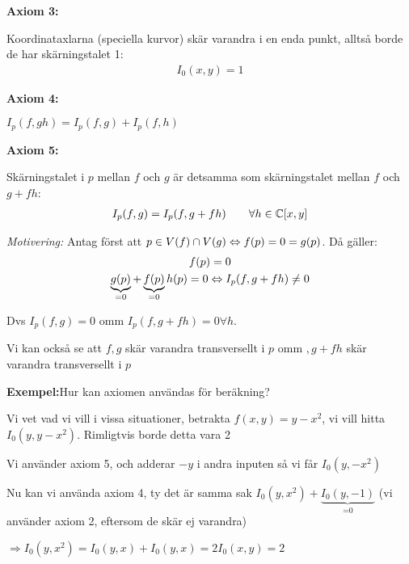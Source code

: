 \par\bigskip
\noindent\textbf{Axiom 3:}\par
\noindent Koordinataxlarna (speciella kurvor) skär varandra i en enda punkt, alltså borde de har skärningstalet 1:
\begin{equation*}
  \begin{gathered}
    I_0(x,y) = 1
  \end{gathered}
\end{equation*}
\par\bigskip
\noindent\textbf{Axiom 4:}\par
\noindent $I_p(f,gh) = I_p(f,g)+I_p(f,h)$ 
\par\bigskip
\noindent\textbf{Axiom 5:}\par
\noindent Skärningstalet i $p$ mellan $f$ och $g$ är detsamma som skärningstalet mellan $f$ och $g+fh$:
\begin{equation*}
  \begin{gathered}
    I_p(f,g) = I_p(f,g+fh)\qquad\forall h\in\mathbb{C}[x,y]
  \end{gathered}
\end{equation*}\par
\noindent\textit{Motivering:} Antag först att $p\in V(f)\cap V(g)\Leftrightarrow f(p)=0=g(p)$. Då gäller:
\begin{equation*}
  \begin{gathered}
    f(p) = 0\\
    \underbrace{g(p)}_{\text{=0}}+\underbrace{f(p)}_{\text{=0}}h(p) = 0\Leftrightarrow I_p(f,g+fh)\neq0
  \end{gathered}
\end{equation*}\par
\noindent Dvs $I_p(f,g) = 0$ omm $I_p(f,g+fh) = 0 \forall h$.\par
\noindent Vi kan också se att $f,g$ skär varandra transversellt i $p$ omm $,g+fh$ skär varandra transversellt i $p$ 
\par\bigskip
\noindent\textbf{Exempel:}Hur kan axiomen användas för beräkning?\par
\noindent Vi vet vad vi vill i vissa situationer, betrakta $f(x,y) = y-x^2$, vi vill hitta $I_0(y,y-x^2)$. Rimligtvis borde detta vara 2
\par\bigskip
\noindent Vi använder axiom 5, och adderar $-y$ i andra inputen så vi får $I_0(y,-x^2)$\par
\noindent Nu kan vi använda axiom 4, ty det är samma sak $I_0(y,x^2) + \underbrace{I_0(y,-1)}_{\text{=0}}$ (vi använder axiom 2, eftersom de skär ej varandra)\par
\noindent $\Rightarrow I_0(y,x^2)=I_0(y,x)+I_0(y,x)=2I_0(x,y)=2$
